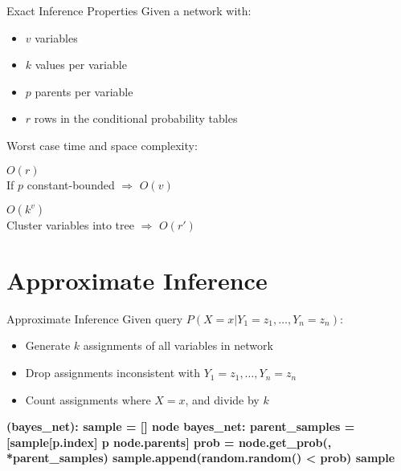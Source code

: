 \documentclass[14pt]{beamer}
\begin{document}
\begin{frame}{Exact Inference Properties}
Given a network with:
\begin{itemize}
\item $v$ variables
\item $k$ values per variable
\item $p$ parents per variable
\item $r$ rows in the conditional probability tables
\end{itemize}
Worst case time and space complexity:
\begin{description}
\item[Singly connected]
$O(r)$ \\
\pause
If $p$ constant-bounded $\Rightarrow$ $O(v)$
\pause
\item[Multiply connected]
$O(k^{v})$ \\
\pause
Cluster variables into tree $\Rightarrow$ $O(r')$
\end{description}
\end{frame}


\section{Approximate Inference}
\begin{frame}[fragile]{Approximate Inference}
Given query $P(X=x|Y_1=z_1,\ldots,Y_n=z_n)$:
\begin{itemize}
\item Generate $k$ assignments of all variables in network
\item Drop assignments inconsistent with {\small$Y_1=z_1,\ldots,Y_n=z_n$}
\item Count assignments where $X\!=\!x$, and divide by $k$
\end{itemize}
\pause
\begin{semiverbatim}\scriptsize\bfseries
{} (bayes_net):
    \pause{}
    sample = []
     node  bayes_net:
        \pause{}
        parent_samples = [sample[p.index]  p  node.parents]
        \pause{}
        prob = node.get_prob(, *parent_samples)
        \pause{}
        sample.append(random.random() < prob)
    \pause{}
     sample
\end{semiverbatim}
\end{frame}
\end{document}
